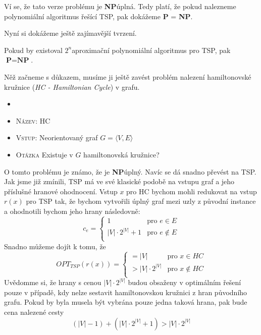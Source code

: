\documentclass[
  biblatex,
  figures=false,
  glossaries,
  index
]{kidiplom}
\begin{document}
Ví se, že tato verze problému je \textbf{NP}\textendash úplná. Tedy platí, že pokud nalezneme polynomiální algoritmus řešící TSP, pak dokážeme \textbf{P} = \textbf{NP}.

Nyní si dokážeme ještě zajímavější tvrzení.
\begin{theorem}
Pokud by existoval $2^n$\textendash aproximační polynomiální algoritmus pro TSP, pak~$\textbf{P} = \textbf{NP}$.
\end{theorem}



Něž začneme s důkazem, musíme ji ještě zavést problém nalezení hamiltonovské kružnice (\textit{HC - Hamiltonian Cycle}) v grafu.
\begin{definition}
\begin{itemize}[label={}]
  \item
  \item \textsc{Název}: HC
  \item \textsc{Vstup}: Neorientovaný graf $G=\langle V, E \rangle$
  \item \textsc{Otázka} Existuje v $G$ hamiltonovská kružnice?
\end{itemize}
\end{definition}

O tomto problému je známo, že je \textbf{NP}\textendash úplný. Navíc se dá snadno převést na TSP. Jak jsme již zmínili, TSP má ve své klasické podobě na vstupu graf a jeho příslušné hranové ohodnocení. Vstup $x$ pro HC bychom mohli redukovat na vstup $r(x)$ pro TSP tak, že bychom vytvořili úplný graf mezi uzly z původní instance a ohodnotili bychom jeho hrany následovně:
$$c_e = \begin{cases}
1  & \text{pro } e \in E\\
|V|\cdot2^{|V|} + 1 & \text{pro } e \not\in E\\
\end{cases}$$
Snadno můžeme dojít k tomu, že
$$OPT_{TSP}(r(x)) = \begin{cases}
= |V|  & \text{pro } x \in HC\\
> |V|\cdot2^{|V|} & \text{pro } x \not\in HC\\
\end{cases}$$
Uvědomme si, že hrany s cenou $|V|\cdot2^{|V|}$ budou obsaženy v optimálním řešení pouze v případě, kdy nelze sestavit hamiltonovskou kružnici z hran původního grafu. Pokud by byla musela být vybrána pouze jedna taková hrana, pak bude cena nalezené cesty $$(|V| - 1) + (|V|\cdot2^{|V|} + 1) > |V|\cdot2^{|V|}$$
\end{document}
